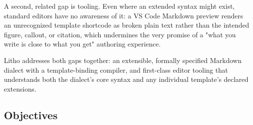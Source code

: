 \documentclass[a4paper,twoside]{article}
\begin{document}
A second, related gap is tooling. Even where an extended syntax might exist, standard editors have no awareness of it: a VS Code Markdown preview renders an unrecognized template shortcode as broken plain text rather than the intended figure, callout, or citation, which undermines the very promise of a "what you write is close to what you get" authoring experience.

Litho addresses both gaps together: an extensible, formally specified Markdown dialect with a template-binding compiler, and first-class editor tooling that understands both the dialect's core syntax and any individual template's declared extensions.

\subsection{Objectives}
\end{document}

